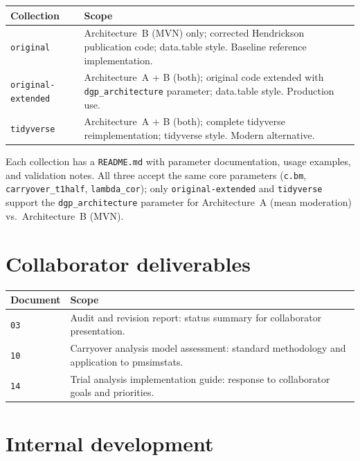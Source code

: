 \documentclass[11pt]{article}
\begin{document}
\begin{center}
\begin{tabular}{lp{8cm}}
\toprule
\textbf{Collection} & \textbf{Scope} \\
\midrule
\texttt{original} & Architecture~B (MVN) only; corrected
  Hendrickson publication code; data.table style. Baseline
  reference implementation. \\
\texttt{original-extended} & Architecture~A + B (both);
  original code extended with
  \texttt{dgp\_architecture} parameter; data.table style.
  Production use. \\
\texttt{tidyverse} & Architecture~A + B (both); complete
  tidyverse reimplementation; tidyverse style. Modern
  alternative. \\
\bottomrule
\end{tabular}
\end{center}

Each collection has a \texttt{README.md} with parameter
documentation, usage examples, and validation notes. All three
accept the same core parameters (\texttt{c.bm},
\texttt{carryover\_t1half}, \texttt{lambda\_cor}); only
\texttt{original-extended} and \texttt{tidyverse} support the
\texttt{dgp\_architecture} parameter for Architecture~A
(mean moderation) vs.\ Architecture~B (MVN).

\section{Collaborator deliverables}

\begin{center}
\begin{tabular}{lp{9cm}}
\toprule
\textbf{Document} & \textbf{Scope} \\
\midrule
\texttt{03} & Audit and revision report: status summary for
  collaborator presentation. \\
\texttt{10} & Carryover analysis model assessment: standard
  methodology and application to pmsimstats. \\
\texttt{14} & Trial analysis implementation guide: response
  to collaborator goals and priorities. \\
\bottomrule
\end{tabular}
\end{center}

\section{Internal development}
\end{document}
